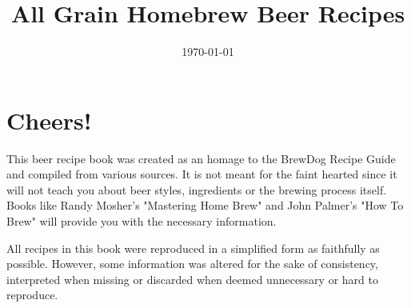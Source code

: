 \documentclass[fontsize=9pt,oneside,toc=chapterentrydotfill]{scrbook}
\begin{document}
\title{All Grain Homebrew Beer Recipes}
\date{\today}
\publishers{Editor: Thomas Ascher}
\dedication{Dedicated to BrauCampus Graz Hobbybrauer Stammtisch}
\maketitle

\frontmatter

\chapter*{Cheers!}

This beer recipe book was created as an homage to the BrewDog Recipe
Guide and compiled from various sources. It is not meant for the faint hearted
since it will not teach you about beer styles, ingredients or the brewing
process itself. Books like Randy Mosher's "Mastering Home Brew" and
John Palmer's "How To Brew" will provide you with the necessary information.

All recipes in this book were reproduced in a simplified form as faithfully
as possible. However, some information was altered for the sake of consistency,
interpreted when missing or discarded when deemed unnecessary or hard to reproduce.

\tableofcontents

\mainmatter





















\end{document}
